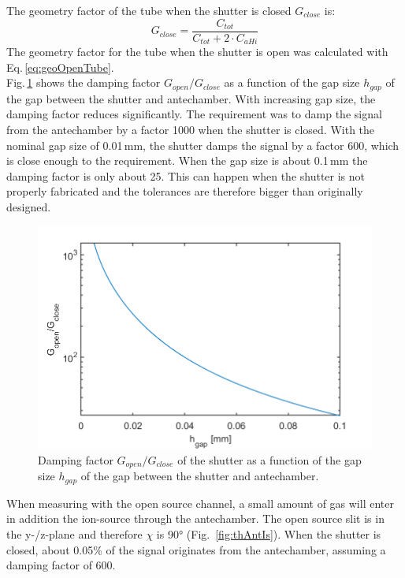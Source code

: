 	The geometry factor of the tube when the shutter is closed $G_{close}$ is:
	\begin{equation}
		G_{close} = \frac{C_{tot}}{C_{tot} + 2\cdot C_{aHi}}
	\end{equation}
	The geometry factor for the tube when the shutter is open was calculated with Eq.\,\eqref{eq:geoOpenTube}.\\
	Fig.\,\ref{fig:ShutGapSizeSigDamp} shows the damping factor $G_{open}/G_{close}$ as a function of the gap size $h_{gap}$ of the gap between the shutter and antechamber. With increasing gap size, the damping factor reduces significantly. The requirement was to damp the signal from the antechamber by a factor 1000 when the shutter is closed. With the nominal gap size of 0.01\,mm, the shutter damps the signal by a factor 600, which is close enough to the requirement. When the gap size is about 0.1\,mm the damping factor is only about 25. This can happen when the shutter is not properly fabricated and the tolerances are therefore bigger than originally designed.\\
		\begin{figure}[H]
		\centering
		\includegraphics[width=.8\textwidth]{Bilder/ShutGapSizeSigDamp.png}
		\caption{Damping factor $G_{open}/G_{close}$ of the shutter as a function of the gap size $h_{gap}$ of the gap between the shutter and antechamber.}
		\label{fig:ShutGapSizeSigDamp}
	\end{figure}
	When measuring with the open source channel, a small amount of gas will enter in addition the ion-source through the antechamber. The open source slit is in the y-/z-plane and therefore $\chi$ is 90° (Fig.~\ref{fig:thAntIs}). When the shutter is closed, about 0.05\% of the signal originates from the antechamber, assuming a damping factor of 600.
	

